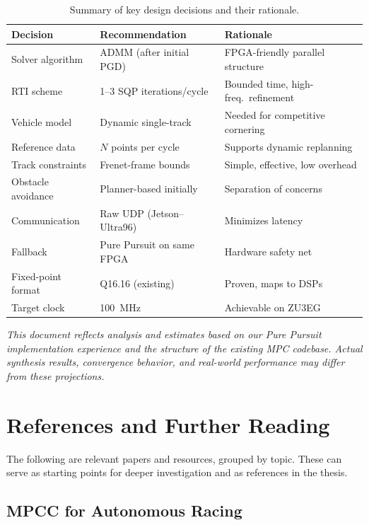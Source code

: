 \documentclass[12pt,a4paper]{article}
\begin{document}
\begin{table}[H]
\centering
\small
\begin{tabular}{lll}
\toprule
\textbf{Decision} & \textbf{Recommendation} & \textbf{Rationale} \\
\midrule
Solver algorithm & ADMM (after initial PGD) & FPGA-friendly parallel structure \\
RTI scheme & 1--3 SQP iterations/cycle & Bounded time, high-freq.\ refinement \\
Vehicle model & Dynamic single-track & Needed for competitive cornering \\
Reference data & $N$ points per cycle & Supports dynamic replanning \\
Track constraints & Frenet-frame bounds & Simple, effective, low overhead \\
Obstacle avoidance & Planner-based initially & Separation of concerns \\
Communication & Raw UDP (Jetson--Ultra96) & Minimizes latency \\
Fallback & Pure Pursuit on same FPGA & Hardware safety net \\
Fixed-point format & Q16.16 (existing) & Proven, maps to DSPs \\
Target clock & 100~MHz & Achievable on ZU3EG \\
\bottomrule
\end{tabular}
\caption{Summary of key design decisions and their rationale.}
\end{table}

\vspace{1em}
\noindent\textit{This document reflects analysis and estimates based on our Pure Pursuit implementation experience and the structure of the existing MPC codebase. Actual synthesis results, convergence behavior, and real-world performance may differ from these projections.}

\section{References and Further Reading}

The following are relevant papers and resources, grouped by topic. These can serve as starting points for deeper investigation and as references in the thesis.

\subsection{MPCC for Autonomous Racing}
\end{document}
